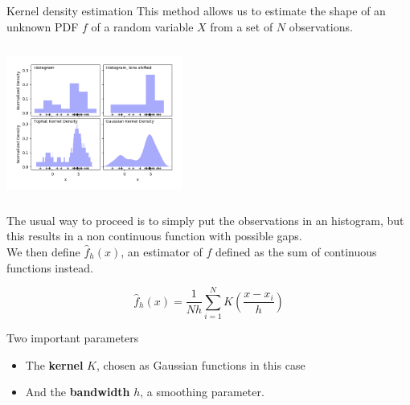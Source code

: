 \documentclass[8 pt]{beamer}
\begin{document}
\begin{frame}{Kernel density estimation}
This method allows us to estimate the shape of an unknown PDF $f$ of a random variable $X$ from a set of $N$ observations.

\begin{minipage}[c]{.50\textwidth}
\includegraphics[width=5.8cm, height=5cm]{figs/kernels.png}
\end{minipage}
\begin{minipage}[c]{.50\textwidth}
\justifying
The usual way to proceed is to simply put the observations in an histogram, but this results in a non continuous function with possible gaps. \\ \vspace{10pt}
We then define $\hat{f}_h(x)$, an estimator of $f$ defined as the sum of continuous functions instead.

\begin{equation*}
\label{eq:KDF}
\hat{f}_h(x) = \frac{1}{Nh} \sum_{i=1}^{N} K \left (\frac{x-x_i}{h} \right )
\end{equation*}
\end{minipage}

Two important parameters
\begin{itemize}
\item The \textbf{\alert{kernel}} $K$, chosen as Gaussian functions in this case
\item And the \textbf{\alert{bandwidth}} $h$, a smoothing parameter.
\end{itemize} \vfill

\end{frame}
\end{document}
